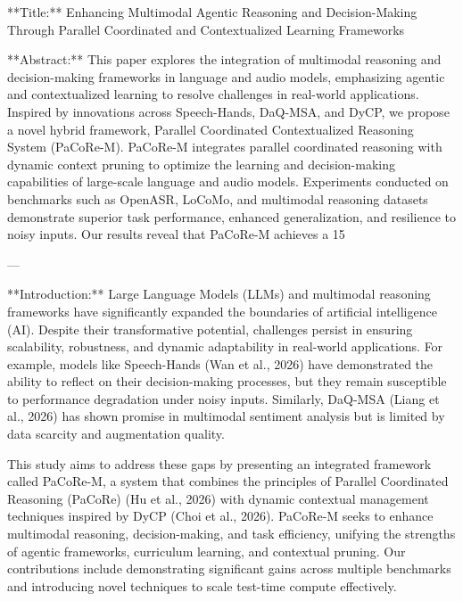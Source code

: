 **Title:** Enhancing Multimodal Agentic Reasoning and Decision-Making Through Parallel Coordinated and Contextualized Learning Frameworks  

**Abstract:**  
This paper explores the integration of multimodal reasoning and decision-making frameworks in language and audio models, emphasizing agentic and contextualized learning to resolve challenges in real-world applications. Inspired by innovations across Speech-Hands, DaQ-MSA, and DyCP, we propose a novel hybrid framework, Parallel Coordinated Contextualized Reasoning System (PaCoRe-M). PaCoRe-M integrates parallel coordinated reasoning with dynamic context pruning to optimize the learning and decision-making capabilities of large-scale language and audio models. Experiments conducted on benchmarks such as OpenASR, LoCoMo, and multimodal reasoning datasets demonstrate superior task performance, enhanced generalization, and resilience to noisy inputs. Our results reveal that PaCoRe-M achieves a 15%

---

**Introduction:**  
Large Language Models (LLMs) and multimodal reasoning frameworks have significantly expanded the boundaries of artificial intelligence (AI). Despite their transformative potential, challenges persist in ensuring scalability, robustness, and dynamic adaptability in real-world applications. For example, models like Speech-Hands (Wan et al., 2026) have demonstrated the ability to reflect on their decision-making processes, but they remain susceptible to performance degradation under noisy inputs. Similarly, DaQ-MSA (Liang et al., 2026) has shown promise in multimodal sentiment analysis but is limited by data scarcity and augmentation quality.

This study aims to address these gaps by presenting an integrated framework called PaCoRe-M, a system that combines the principles of Parallel Coordinated Reasoning (PaCoRe) (Hu et al., 2026) with dynamic contextual management techniques inspired by DyCP (Choi et al., 2026). PaCoRe-M seeks to enhance multimodal reasoning, decision-making, and task efficiency, unifying the strengths of agentic frameworks, curriculum learning, and contextual pruning. Our contributions include demonstrating significant gains across multiple benchmarks and introducing novel techniques to scale test-time compute effectively.

